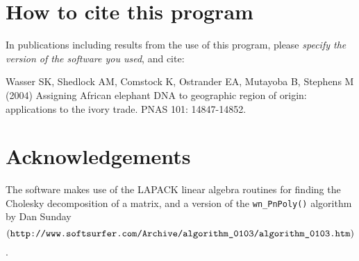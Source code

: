 \documentclass[10pt,titlepage,times,letterpaper]{article}
\begin{document}
\section{How to cite this program}

In publications including results from the use of this program, please
{\it specify the version of the software you used}, and cite:

Wasser SK, Shedlock AM, Comstock K, Ostrander EA, Mutayoba B, Stephens M (2004)
Assigning African elephant DNA to geographic region of origin:  applications
to the ivory trade.  PNAS 101: 14847-14852.


\section{Acknowledgements}

The software makes use of the LAPACK linear algebra routines for
finding the Cholesky decomposition of a matrix, and a version of the
{\tt wn\_PnPoly()} algorithm by Dan Sunday 
$$(\text{\tt http://www.softsurfer.com/Archive/algorithm\_0103/algorithm\_0103.htm})$$.


%
%
\end{document}
